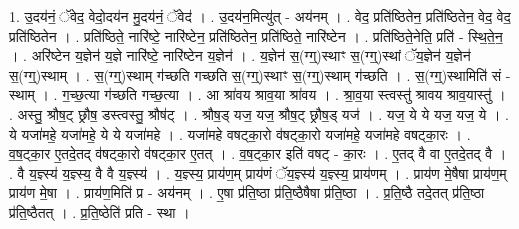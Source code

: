 \documentclass[17pt]{extarticle}
\begin{document}
1. उ॒दय॑नं॒ ॅवेद॒ वेदो॒दय॑न मु॒दय॑नं॒ ॅवेद॑ । . उ॒दय॑न॒मित्यु॑त् - अय॑नम् । . वेद॒ प्रति॑ष्ठितेन॒ प्रति॑ष्ठितेन॒ वेद॒ वेद॒ प्रति॑ष्ठितेन । . प्रति॑ष्ठिते॒ नारि॑ष्टे॒ नारि॑ष्टेन॒ प्रति॑ष्ठितेन॒ प्रति॑ष्ठिते॒ नारि॑ष्टेन । . प्रति॑ष्ठिते॒नेति॒ प्रति॑ - स्थि॒ते॒न॒ । . अरि॑ष्टेन य॒ज्ञेन॑ य॒ज्ञे नारि॑ष्टे॒ नारि॑ष्टेन य॒ज्ञेन॑ । . य॒ज्ञेन॑ स॒(ग्ग्॒)स्थाꣳ स॒(ग्ग्॒)स्थां ॅय॒ज्ञेन॑ य॒ज्ञेन॑ स॒(ग्ग्॒)स्थाम् । . स॒(ग्ग्॒)स्थाम् ग॑च्छति गच्छति स॒(ग्ग्॒)स्थाꣳ स॒(ग्ग्॒)स्थाम् ग॑च्छति । . स॒(ग्ग्॒)स्थामिति॑ सं - स्थाम् । . ग॒च्छ॒त्या ग॑च्छति गच्छ॒त्या । . आ श्रा॑वय श्राव॒या श्रा॑वय । . श्रा॒व॒या स्त्वस्तु॑ श्रावय श्राव॒यास्तु॑ । . अस्तु॒ श्रौष॒ट् छ्रौष॒ डस्त्वस्तु॒ श्रौष॑ट् । . श्रौष॒ड् यज॒ यज॒ श्रौष॒ट् छ्रौष॒ड् यज॑ । . यज॒ ये ये यज॒ यज॒ ये । . ये यजा॑महे॒ यजा॑महे॒ ये ये यजा॑महे । . यजा॑महे वषट्का॒रो व॑षट्का॒रो यजा॑महे॒ यजा॑महे वषट्का॒रः । . व॒ष॒ट्का॒र ए॒तदे॒तद् व॑षट्का॒रो व॑षट्का॒र ए॒तत् । . व॒ष॒ट्का॒र इति॑ वषट् - का॒रः । . ए॒तद् वै वा ए॒तदे॒तद् वै । . वै य॒ज्ञ्स्य॑ य॒ज्ञ्स्य॒ वै वै य॒ज्ञ्स्य॑ । . य॒ज्ञ्स्य॒ प्राय॑ण॒म् प्राय॑णं ॅय॒ज्ञ्स्य॑ य॒ज्ञ्स्य॒ प्राय॑णम् । . प्राय॑ण मे॒षैषा प्राय॑ण॒म् प्राय॑ण मे॒षा । . प्राय॑ण॒मिति॑ प्र - अय॑नम् । . ए॒षा प्र॑ति॒ष्ठा प्र॑ति॒ष्ठैषैषा प्र॑ति॒ष्ठा । . प्र॒ति॒ष्ठै तदे॒तत् प्र॑ति॒ष्ठा प्र॑ति॒ष्ठैतत् । . प्र॒ति॒ष्ठेति॑ प्रति - स्था । \newline
\end{document}
